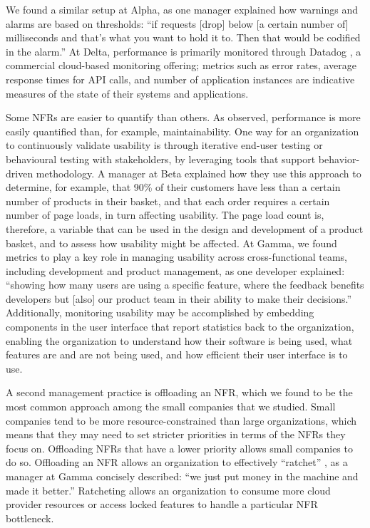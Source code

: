 \documentclass[smallextended]{svjour3}       %
\begin{document}
\noindent We found a similar setup at Alpha, as one manager explained how warnings and alarms are based on thresholds:
\textmd{``if requests [drop] below [a certain number of] milliseconds and that's what you want to hold it to. Then that would be codified in the alarm.''}
At Delta, performance is primarily monitored through Datadog \citep{data_dog}, a commercial cloud-based monitoring offering; metrics such as error rates, average response times for API calls, and number of application instances are indicative measures of the state of their systems and applications. 

Some NFRs are easier to quantify than others. As \citet{wagner2019status} observed, performance is more easily quantified than, for example, maintainability.
One way for an organization to continuously validate usability is through iterative end-user testing or behavioural testing with stakeholders, by leveraging tools that support behavior-driven methodology. 
A manager at Beta explained how they use this approach to determine, for example, that 90\% of their customers have less than a certain number of products in their basket, and that each order requires a certain number of page loads, in turn affecting usability. The page load count is, therefore, a variable that can be used in the design and development of a product basket, and to assess how usability might be affected. 
At Gamma, we found metrics to play a key role in managing usability across cross-functional teams, including development and product management, as one developer explained:
\textmd{``showing how many users are using a specific feature, where the feedback benefits developers but [also] our product team in their ability to make their decisions.''}
Additionally, monitoring usability may be accomplished by embedding components in the user interface that report statistics back to the organization, enabling the organization to understand how their software is being used, what features are and are not being used, and how efficient their user interface is to use.


A second management practice is offloading an NFR, which we found to be the most common approach among the small companies that we studied. 
Small companies tend to be more resource-constrained than large organizations, which means that they may need to set stricter priorities in terms of the NFRs they focus on. Offloading NFRs that have a lower priority allows small companies to do so. 
Offloading an NFR allows an organization to effectively ``ratchet'' \citep{bellomo2014}, as a manager at Gamma concisely described: \textmd{``we just put money in the machine and made it better.''}
Ratcheting allows an organization to consume more cloud provider resources or access locked features to handle a particular NFR bottleneck.
\end{document}
